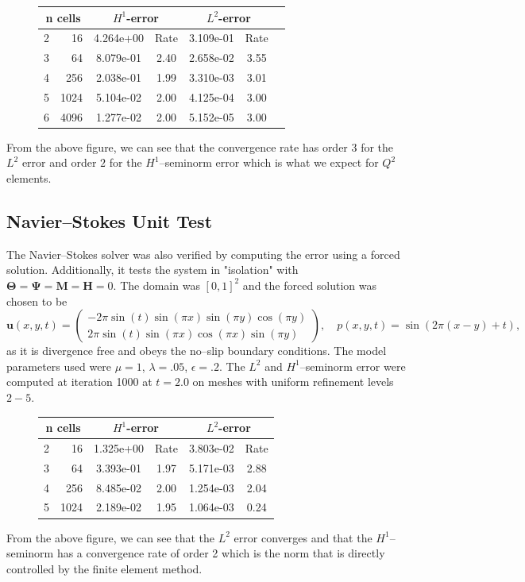 \documentclass[11pt,fullpage]{article}
\newcommand{\eps}{\epsilon}
\theoremstyle{lemma}
\theoremstyle{definition}
\theoremstyle{lemma}
\begin{document}
\begin{figure}[!ht]
	\centering
	\begin{tabular}{|c|r|c|c|c|c|c|} \hline
		\multicolumn{2}{|c|}{n cells} & 
		\multicolumn{2}{|c|}{$H^1$-error} & 
		\multicolumn{2}{|c|}{$L^2$-error}\\ \hline
		2 & 16 & 4.264e+00 & Rate & 3.109e-01 &  Rate\\ \hline
		3 & 64 & 8.079e-01 &  2.40 & 2.658e-02 &  3.55\\ \hline
		4 & 256 & 2.038e-01 &  1.99 & 3.310e-03 &  3.01\\ \hline
		5 & 1024 & 5.104e-02 &  2.00 & 4.125e-04 &  3.00\\ \hline
		6 & 4096 & 1.277e-02 &  2.00 & 5.152e-05 &  3.00\\ \hline
	\end{tabular}
\end{figure}
\noindent From the above figure, we can see that the convergence rate has order 3 for the $L^2$ error and order $2$ for the $H^1$--seminorm error which is what we expect for $Q^2$ elements.

\subsection{Navier--Stokes Unit Test}
The Navier--Stokes solver was also verified by computing the error using a forced solution. Additionally, it tests the system in "isolation" with $\mathbf{\Theta} = \mathbf{\Psi} = \mathbf{M} = \mathbf{H} = 0$. The domain was $[0,1]^2$ and the forced solution was chosen to be
$$
\mathbf{u}(x,y,t) = \begin{pmatrix}
-2\pi\sin(t)\sin(\pi x)\sin(\pi y)\cos(\pi y)\\
2\pi\sin(t)\sin(\pi x)\cos(\pi x)\sin(\pi y)
\end{pmatrix}, \quad p(x,y,t) = \sin(2\pi(x - y) + t),
$$
as it is divergence free and obeys the no--slip boundary conditions. The model parameters used were $\mu = 1$, $\lambda = .05$, $\eps = .2$. The $L^2$ and $H^1$--seminorm error were computed at iteration 1000 at $t=2.0$ on meshes with uniform refinement levels $2-5$.
\begin{figure}[!ht]
	\centering
	\begin{tabular}{|c|r|c|c|c|c|} \hline
		\multicolumn{2}{|c|}{n cells} & 
		\multicolumn{2}{|c|}{$H^1$-error} & 
		\multicolumn{2}{|c|}{$L^2$-error}\\ \hline
		2 & 16 & 1.325e+00 &  Rate & 3.803e-02 & Rate\\ \hline
		3 & 64 & 3.393e-01 &  1.97 & 5.171e-03 & 2.88\\ \hline
		4 & 256 & 8.485e-02 &  2.00 & 1.254e-03 & 2.04\\ \hline
		5 & 1024 & 2.189e-02 &  1.95 & 1.064e-03 & 0.24\\ \hline
	\end{tabular}
\end{figure}
From the above figure, we can see that the $L^2$ error converges and that the $H^1$--seminorm has a convergence rate of order 2 which is the norm that is directly controlled by the finite element method.
\end{document}
